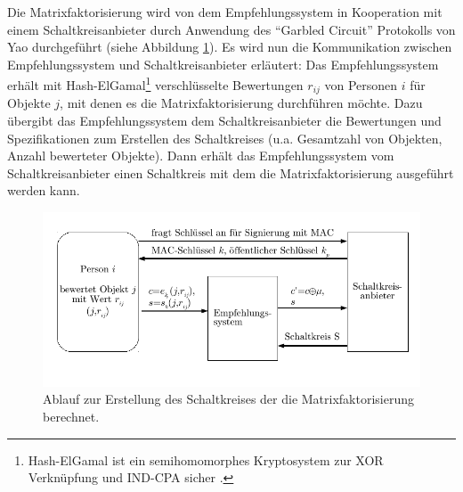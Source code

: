 Die Matrixfaktorisierung wird von dem Empfehlungssystem in Kooperation mit einem Schaltkreisanbieter durch Anwendung des \enquote{Garbled Circuit} Protokolls von Yao \cite{yao1982protocols} durchgeführt (siehe Abbildung \ref{fig:Matrix}). Es wird nun die Kommunikation zwischen Empfehlungssystem und Schaltkreisanbieter erläutert: Das Empfehlungssystem erhält mit Hash-ElGamal\footnote{Hash-ElGamal ist ein semihomomorphes Kryptosystem zur XOR Verknüpfung \cite[Appendix B]{nikolaenko2013privacy} und IND-CPA sicher \cite[p.6]{chevallier2006encoding}.} verschlüsselte Bewertungen $r_{ij}$ von Personen $i$ für Objekte $j$, mit denen es die Matrixfaktorisierung durchführen möchte. Dazu übergibt das Empfehlungssystem dem Schaltkreisanbieter die Bewertungen und Spezifikationen zum Erstellen des Schaltkreises (u.a. Gesamtzahl von Objekten, Anzahl bewerteter Objekte). Dann erhält das Empfehlungssystem vom Schaltkreisanbieter einen Schaltkreis mit dem die Matrixfaktorisierung ausgeführt werden kann. 

\begin{figure}[h] 
	\begin{center}
		\includegraphics{fig/Matrix}
		\caption{Ablauf zur Erstellung des Schaltkreises der die Matrixfaktorisierung berechnet.}
		\label{fig:Matrix}
	\end{center}
\end{figure}


